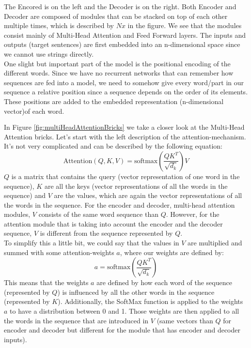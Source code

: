 The Encored is on the left and the Decoder is on the right. Both Encoder and Decoder
are composed of modules that can be stacked on top of each other multiple times,
which is described by $Nx$ in the figure. We see that the modules consist mainly
of Multi-Head Attention and Feed Forward layers. The inputs and outputs (target sentences)
are first embedded into an n-dimensional space since we cannot use strings
directly. \\ One slight but important part of the model is the positional encoding
of the different words. Since we have no recurrent networks that can remember
how sequences are fed into a model, we need to somehow give every word/part in our
sequence a relative position since a sequence depends on the order of its elements.
These positions are added to the embedded representation (n-dimensional vector)of
each word.
\newline

In Figure \ref{fig:multiHeadAttentionBricks} we take a closer look at the Multi-Head
Attention bricks. Let's start with the left description of the attention-mechanism.
It's not very complicated and can be described by the following equation:
\begin{equation}
	\text{Attention}(Q,K,V) = \text{softmax}(\frac{QK^{T}}{\sqrt{d_{k}}}) V
\end{equation}
$Q$ is a matrix that contains the query (vector representation of one word in the
sequence), $K$ are all the keys (vector representations of all the words in the
sequence) and $V$ are the values, which are again the vector representations of
all the words in the sequence. For the encoder and decoder, multi-head attention
modules, $V$ consists of the same word sequence than $Q$. However, for the attention
module that is taking into account the encoder and the decoder sequence, $V$ is
different from the sequence represented by $Q$.\\ To simplify this a little bit,
we could say that the values in $V$ are multiplied and summed with some attention-weights
$a$, where our weights are defined by:
\begin{equation}
	a = \text{softmax}(\frac{QK^{T}}{\sqrt{d_{k}}})
\end{equation}
This means that the weights $a$ are defined by how each word of the sequence (represented
by $Q$) is influenced by all the other words in the sequence (represented by $K$).
Additionally, the SoftMax function is applied to the weights $a$ to have a distribution
between 0 and 1. Those weights are then applied to all the words in the sequence
that are introduced in $V$ (same vectors than $Q$ for encoder and decoder but
different for the module that has encoder and decoder inputs).
\newline

